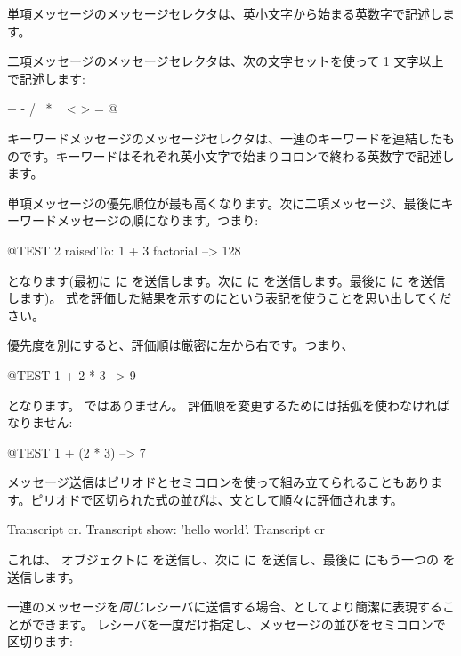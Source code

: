 \documentclass[a4paper,10pt,twoside]{book}
\begin{document}
単項メッセージのメッセージセレクタは、英小文字から始まる英数字で記述します。

二項メッセージのメッセージセレクタは、次の文字セットを使って 1 文字以上で記述します:
\begin{code}{}
+ - / \ * ~ < > = @ %
\end{code}
\noindent
キーワードメッセージのメッセージセレクタは、一連のキーワードを連結したものです。キーワードはそれぞれ英小文字で始まりコロンで終わる英数字で記述します。

単項メッセージの優先順位が最も高くなります。次に二項メッセージ、最後にキーワードメッセージの順になります。つまり:
\begin{code}{@TEST}
2 raisedTo: 1 + 3 factorial --> 128
\end{code}
となります(最初に  に  を送信します。次に  に  を送信します。最後に  に  を送信します)。
式を評価した結果を示すのに\ct{-->}という表記を使うことを思い出してください。

優先度を別にすると、評価順は厳密に左から右です。つまり、
\begin{code}{@TEST}
1 + 2 * 3 --> 9
\end{code}
となります。 ではありません。
評価順を変更するためには括弧を使わなければなりません:
\begin{code}{@TEST}
1 + (2 * 3) --> 7
\end{code}

メッセージ送信はピリオドとセミコロンを使って組み立てられることもあります。ピリオドで区切られた式の並びは、文として順々に評価されます。

\begin{code}{}
Transcript cr.
Transcript show: 'hello world'.
Transcript cr
\end{code}

\noindent
これは、 オブジェクトに  を送信し、次に  に  を送信し、最後に  にもう一つの  を送信します。

一連のメッセージを\emph{同じ}レシーバに送信する場合、としてより簡潔に表現することができます。
レシーバを一度だけ指定し、メッセージの並びをセミコロンで区切ります:
\end{document}
